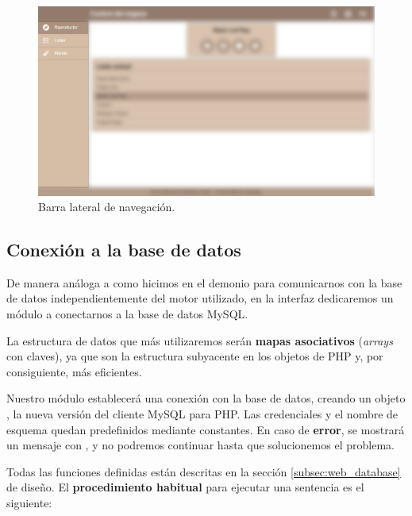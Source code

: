 \smallskip

\begin{figure}[H]
	\noindent \begin{centering}
		\includegraphics[width=\linewidth*3/4]{capitulo5/cap_navigation}
		\par\end{centering}
	\smallskip
	\caption{\label{fig:cap_navigation} Barra lateral de navegación.}
\end{figure} 

\smallskip

\subsection{Conexión a la base de datos}

De manera análoga a como hicimos en el demonio para comunicarnos con la base de datos independientemente del motor utilizado, en la interfaz dedicaremos un módulo a conectarnos a la base de datos MySQL.

La estructura de datos que más utilizaremos serán \textbf{mapas asociativos} (\textit{arrays} con claves), ya que son la estructura subyacente en los objetos de PHP y, por consiguiente, más eficientes.

Nuestro módulo establecerá una conexión con la base de datos, creando un objeto , la nueva versión del cliente MySQL para PHP. Las credenciales y el nombre de esquema quedan predefinidos mediante constantes. En caso de \textbf{error}, se mostrará un mensaje con , y no podremos continuar hasta que solucionemos el problema.

Todas las funciones definidas están descritas en la sección \ref{subsec:web_database} de diseño. El \textbf{procedimiento habitual} para ejecutar una sentencia es el siguiente:

